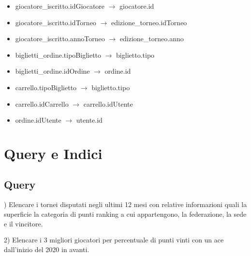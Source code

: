 \documentclass[10pt]{article}
\newcommand{\spazia}{\par\medskip}
\begin{document}
\begin{itemize}
    \item giocatore\_iscritto.idGiocatore $\rightarrow$ giocatore.id
    \item giocatore\_iscritto.idTorneo $\rightarrow$ edizione\_torneo.idTorneo
    \item giocatore\_iscritto.annoTorneo $\rightarrow$ edizione\_torneo.anno
    \item biglietti\_ordine.tipoBiglietto $\rightarrow$ biglietto.tipo
    \item biglietti\_ordine.idOrdine $\rightarrow$ ordine.id
    \item carrello.tipoBiglietto $\rightarrow$ biglietto.tipo
    \item carrello.idCarrello $\rightarrow$ carrello.idUtente
    \item ordine.idUtente $\rightarrow$ utente.id
\end{itemize}\spazia \spazia \spazia
\section{Query e Indici}
\spazia 
\subsection{Query}\spazia
1) Elencare i tornei disputati negli ultimi 12 mesi con relative informazioni quali la superficie la categoria di punti ranking a cui appartengono, la federazione, la sede e il vincitore.

\begin{figure}[h]
\end{figure}
\spazia

2) Elencare i 3 migliori giocatori per percentuale di punti vinti con un ace dall'inizio del 2020 in avanti.

\begin{figure}[h]
\end{figure}
\spazia
\end{document}
